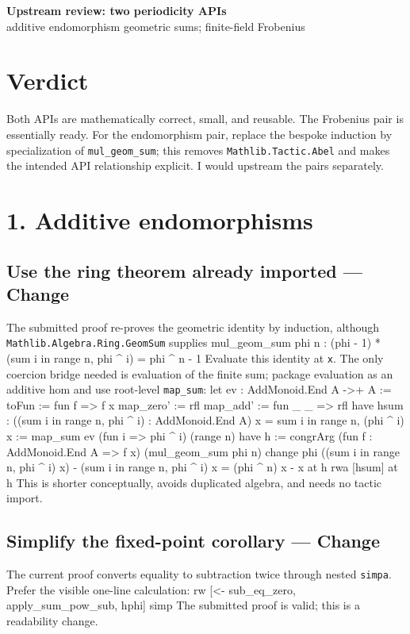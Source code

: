 \documentclass[10pt]{article}
\newenvironment{lean}{\Verbatim[fontsize=\scriptsize,frame=single,framesep=1.5mm,formatcom=\leanfont]}{\endVerbatim}
\newcommand{\high}{\textcolor{hi}{\textbf{Change}}}
\begin{document}
\begin{center}
{\Large\bfseries Upstream review: two periodicity APIs}\\[-1mm]
\small additive endomorphism geometric sums; finite-field Frobenius
\end{center}
\small

\section*{Verdict}
Both APIs are mathematically correct, small, and reusable. The Frobenius pair is essentially ready.
For the endomorphism pair, replace the bespoke induction by specialization of
\texttt{mul\_geom\_sum}; this removes \texttt{Mathlib.Tactic.Abel} and makes the intended API
relationship explicit. I would upstream the pairs separately.

\section*{1. Additive endomorphisms}
\subsection*{Use the ring theorem already imported --- \high}
The submitted proof re-proves the geometric identity by induction, although
\texttt{Mathlib.Algebra.Ring.GeomSum} supplies
\begin{lean}
mul_geom_sum phi n :
  (phi - 1) * (sum i in range n, phi ^ i) = phi ^ n - 1
\end{lean}
Evaluate this identity at \texttt{x}. The only coercion bridge needed is evaluation of the finite
sum; package evaluation as an additive hom and use root-level \texttt{map\_sum}:
\begin{lean}
let ev : AddMonoid.End A ->+ A :=
  { toFun := fun f => f x
    map_zero' := rfl
    map_add' := fun _ _ => rfl }
have hsum : ((sum i in range n, phi ^ i) : AddMonoid.End A) x =
    sum i in range n, (phi ^ i) x :=
  map_sum ev (fun i => phi ^ i) (range n)
have h := congrArg (fun f : AddMonoid.End A => f x)
  (mul_geom_sum phi n)
change phi ((sum i in range n, phi ^ i) x) -
  (sum i in range n, phi ^ i) x = (phi ^ n) x - x at h
rwa [hsum] at h
\end{lean}
This is shorter conceptually, avoids duplicated algebra, and needs no tactic import.

\subsection*{Simplify the fixed-point corollary --- \high}
The current proof converts equality to subtraction twice through nested \texttt{simpa}. Prefer the
visible one-line calculation:
\begin{lean}
rw [<- sub_eq_zero, apply_sum_pow_sub, hphi]
simp
\end{lean}
The submitted proof is valid; this is a readability change.
\end{document}
